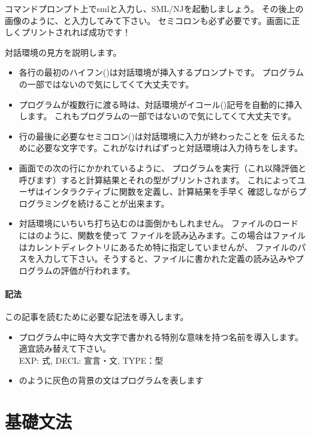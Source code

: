 \documentclass[11pt,a4paper]{article}
\begin{document}
コマンドプロンプト上でsmlと入力し、SML/NJを起動しましょう。
その後上の画像のように、と入力してみて下さい。
セミコロンも必ず必要です。画面に正しくプリントされれば成功です！

対話環境の見方を説明します。
\begin{itemize}
\item 各行の最初のハイフン(\prog{-})は対話環境が挿入するプロンプトです。
  プログラムの一部ではないので気にしてくて大丈夫です。
\item プログラムが複数行に渡る時は、対話環境がイコール(\prog{=})記号を自動的に挿入します。
  これもプログラムの一部ではないので気にしてくて大丈夫です。
\item 行の最後に必要なセミコロン(\prog{;})は対話環境に入力が終わったことを
  伝えるために必要な文字です。これがなければずっと対話環境は入力待ちをします。
\item 画面での次の行にかかれているように、
  プログラムを実行（これ以降評価と呼びます）すると計算結果とそれの型がプリントされます。
  これによってユーザはインタラクティブに関数を定義し、計算結果を手早く
  確認しながらプログラミングを続けることが出来ます。
\item 対話環境にいちいち打ち込むのは面倒かもしれません。
  ファイルのロードにはのように、関数を使って
  ファイルを読み込みます。この場合はファイルはカレントディレクトリにあるため特に指定していませんが、
  ファイルのパスを入力して下さい。そうすると、ファイルに書かれた定義の読み込みやプログラムの評価が行われます。
\end{itemize}

\subsection{記法}

この記事を読むために必要な記法を導入します。

\begin{itemize}
\item プログラム中に時々大文字で書かれる特別な意味を持つ名前を導入します。適宜読み替えて下さい。\\
  EXP: 式, DECL: 宣言・文, TYPE：型
\item {}のように灰色の背景の文はプログラムを表します
\end{itemize}


\part{基礎文法}
\end{document}
